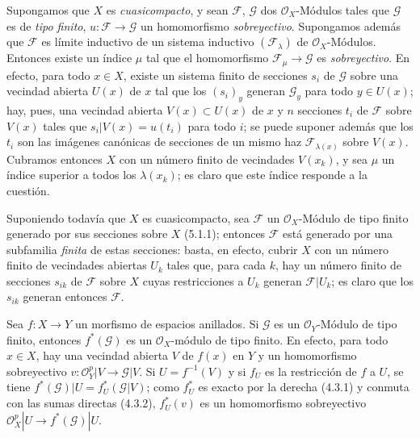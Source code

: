 \begin{env}[5.2.3]
\label{0.5.2.3-fr}
Supongamos que $X$ es \emph{cuasicompacto}, y sean $\mathcal{F}$, $\mathcal{G}$ dos
$\mathcal{O}_X$-Módulos tales que $\mathcal{G}$ es de \emph{tipo finito},
$u:\mathcal{F}\to\mathcal{G}$ un homomorfismo \emph{sobreyectivo}. Supongamos
además que $\mathcal{F}$ es límite inductivo de un sistema inductivo
$(\mathcal{F}_\lambda)$ de $\mathcal{O}_X$-Módulos. Entonces existe un índice
$\mu$ tal que el homomorfismo $\mathcal{F}_\mu\to\mathcal{G}$ es
\emph{sobreyectivo}. En efecto, para todo $x\in X$, existe un sistema finito de
secciones $s_i$ de $\mathcal{G}$ sobre una vecindad abierta $U(x)$ de $x$
tal que los $(s_i)_y$ generan $\mathcal{G}_y$ para todo $y\in U(x)$; hay,
pues, una vecindad abierta $V(x)\subset U(x)$ de $x$ y $n$ secciones $t_i$ de
$\mathcal{F}$ sobre $V(x)$ tales que
$s_i|V(x)=u(t_i)$ para todo $i$; se puede suponer además que los $t_i$ son
las imágenes canónicas de secciones de un mismo haz
$\mathcal{F}_{\lambda(x)}$ sobre $V(x)$. Cubramos entonces $X$ con un
número finito de vecindades $V(x_k)$, y sea $\mu$ un índice superior a todos
los $\lambda(x_k)$; es claro que este índice responde a la cuestión.

Suponiendo todavía que $X$ es cuasicompacto, sea $\mathcal{F}$ un
$\mathcal{O}_X$-Módulo de tipo finito generado por sus secciones sobre $X$
(5.1.1); entonces $\mathcal{F}$ está generado por una subfamilia \emph{finita}
de estas secciones: basta, en efecto, cubrir $X$ con un número finito de
vecindades abiertas $U_k$ tales que, para cada $k$, hay un número finito de
secciones $s_{ik}$ de $\mathcal{F}$ sobre $X$ cuyas restricciones a
$U_k$ generan $\mathcal{F}|U_k$; es claro que los $s_{ik}$ generan
entonces $\mathcal{F}$.
\end{env}

\begin{env}[5.2.4]
\label{0.5.2.4-fr}
Sea $f:X\to Y$ un morfismo de espacios anillados. Si $\mathcal{G}$ es un
$\mathcal{O}_Y$-Módulo de tipo finito, entonces $f^*(\mathcal{G})$ es un
$\mathcal{O}_X$-módulo de tipo finito. En efecto, para todo $x\in X$, hay una
vecindad abierta $V$ de $f(x)$ en $Y$ y un homomorfismo sobreyectivo
$v:\mathcal{O}_Y^p|V\to\mathcal{G}|V$. Si $U=f^{-1}(V)$ y si $f_U$ es la
restricción de $f$ a $U$, se tiene
$f^*(\mathcal{G})|U=f_U^*(\mathcal{G}|V)$; como $f_U^*$ es exacto por la derecha
(4.3.1) y conmuta con las sumas directas (4.3.2), $f_U^*(v)$ es un
homomorfismo sobreyectivo
$\mathcal{O}_X^p|U\to f^*(\mathcal{G})|U$.
\end{env}

